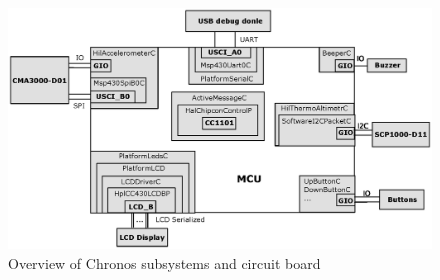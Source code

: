\begin{figure}[h]
  \centering
  \includegraphics[width=1.05\textwidth]{diagrams/chronos_schema.eps}
  \caption{Overview of Chronos subsystems and circuit board}
  \label{fig:chronos_schema}
\end{figure}
\begin{lstlisting}
\end{lstlisting}



